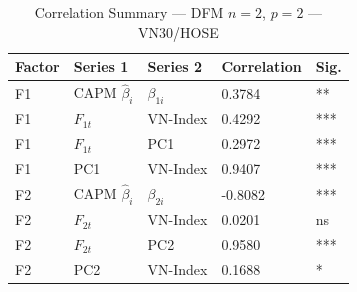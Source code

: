 \begin{table}[h]\centering
\caption{Correlation Summary — DFM $n=2$, $p=2$ — VN30/HOSE}
\begin{tabular}{lllll}
\toprule
Factor & Series 1 & Series 2 & Correlation & Sig. \\
\midrule
F1 & CAPM $\hat{\beta}_i$ & $\beta_{1i}$ & 0.3784 & ** \\
F1 & $F_{1t}$ & VN-Index & 0.4292 & *** \\
F1 & $F_{1t}$ & PC1 & 0.2972 & *** \\
F1 & PC1 & VN-Index & 0.9407 & *** \\
F2 & CAPM $\hat{\beta}_i$ & $\beta_{2i}$ & -0.8082 & *** \\
F2 & $F_{2t}$ & VN-Index & 0.0201 & ns \\
F2 & $F_{2t}$ & PC2 & 0.9580 & *** \\
F2 & PC2 & VN-Index & 0.1688 & * \\
\bottomrule
\end{tabular}
\end{table}

